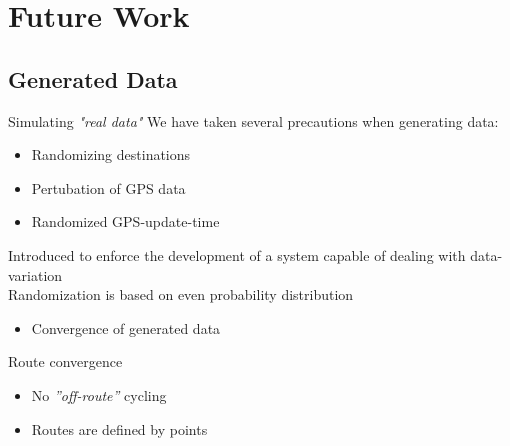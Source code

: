 \section{Future Work}

\subsection{Generated Data}
\begin{frame}{Simulating \textit{"real data"}}
We have taken several precautions when generating data:
\begin{itemize}
\item Randomizing destinations
\item Pertubation of GPS data
\item Randomized GPS-update-time
\end{itemize}
Introduced to enforce the development of a system capable of dealing with data-variation\\\vspace{1em}
Randomization is based on even probability distribution
\begin{itemize}
\item Convergence of generated data
\end{itemize}
\end{frame}

\begin{frame}{Route convergence}
\begin{center}
\end{center}
\begin{itemize}
\item No \textit{''off-route''} cycling
\item Routes are defined by points
\end{itemize}
\end{frame}


